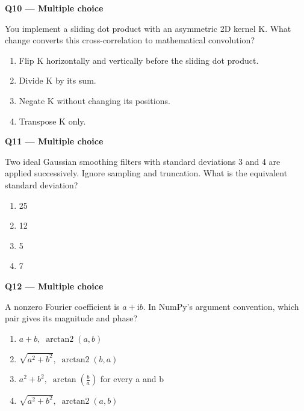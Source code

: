 \documentclass[11pt,a4paper]{article}
\begin{document}
\par\vspace{12pt}
\begin{minipage}{\linewidth}
\textbf{Q10 — Multiple choice}\par\smallskip
You implement a sliding dot product with an asymmetric 2D kernel K. What change converts this cross-correlation to mathematical convolution?
\begin{enumerate}[label=\textbf{\Alph*.}]
\item Flip K horizontally and vertically before the sliding dot product.
\item Divide K by its sum.
\item Negate K without changing its positions.
\item Transpose K only.
\end{enumerate}
\end{minipage}
\par\vspace{12pt}
\begin{minipage}{\linewidth}
\textbf{Q11 — Multiple choice}\par\smallskip
Two ideal Gaussian smoothing filters with standard deviations 3 and 4 are applied successively. Ignore sampling and truncation. What is the equivalent standard deviation?
\begin{enumerate}[label=\textbf{\Alph*.}]
\item 25
\item 12
\item 5
\item 7
\end{enumerate}
\end{minipage}
\par\vspace{12pt}
\begin{minipage}{\linewidth}
\textbf{Q12 — Multiple choice}\par\smallskip
A nonzero Fourier coefficient is \(a+\mathrm{i}b\). In NumPy's argument convention,\allowbreak{} which pair gives its magnitude and phase?
\begin{enumerate}[label=\textbf{\Alph*.}]
\item \(a+b,\;\operatorname{arctan2}(a,b)\)
\item \(\sqrt{a^2+b^2},\;\operatorname{arctan2}(b,a)\)
\item \(a^2+b^2,\;\arctan\!\left(\frac{b}{a}\right)\) for every a and b
\item \(\sqrt{a^2+b^2},\;\operatorname{arctan2}(a,b)\)
\end{enumerate}
\end{minipage}
\end{document}

